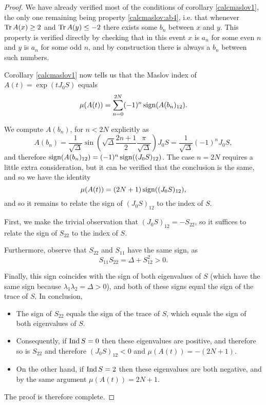 \begin{proof}
We have already verified most of the conditions of corollary \ref{calcmaslov1}, the only one remaining being property \ref{calcmaslov:ab4}, i.e. that whenever $\operatorname{Tr} A(x) \geq 2$ and $\operatorname{Tr} A(y) \leq -2$ there exists some $b_n$ between $x$ and $y$. This property is verified directly by checking that in this event $x$ is $a_n$ for some even $n$ and $y$ is $a_n$ for some odd $n$, and by construction there is always a $b_n$ between such numbers.

Corollary \ref{calcmaslov1} now tells us that the Maslov index of $A(t) = \exp(t J_0 S)$ equals
\begin{equation}
\mu(A(t)) = \sum_{n = 0}^{2N} (-1)^n \operatorname{sign}(A(b_n)_{12}).
\end{equation}

We compute $A(b_n)$, for $n < 2N$ explicitly as
\begin{equation}
A(b_n) = \frac1{\sqrt\Delta} \sin\left( \sqrt\Delta \frac{2n + 1}2 \frac\pi{\sqrt\Delta} \right) J_0 S = \frac1{\sqrt\Delta} (-1)^n J_0 S,
\end{equation}
and therefore $\operatorname{sign}(A(b_n)_{12}) = (-1)^n \operatorname{sign}((J_0 S)_{12})$. The case $n = 2N$ requires a little extra consideration, but it can be verified that the conclusion is the same, and so we have the identity
\begin{equation}
\mu(A(t)) = (2N+1) \operatorname{sign}((J_0 S)_{12}),
\end{equation}
and so it remains to relate the sign of $(J_0 S)_{12}$ to the index of $S$.

First, we make the trivial observation that $(J_0 S)_{12} = - S_{22}$, so it suffices to relate the sign of $S_{22}$ to the index of $S$.

Furthermore, observe that $S_{22}$ and $S_{11}$ have the same sign, as
\begin{equation}
S_{11} S_{22} = \Delta + S_{12}^2 > 0.
\end{equation}

Finally, this sign coincides with the sign of both eigenvalues of $S$ (which have the same sign because $\lambda_1 \lambda_2 = \Delta > 0$), and both of these signs equal the sign of the trace of $S$. In conclusion,
\begin{itemize}
\item The sign of $S_{22}$ equals the sign of the trace of $S$, which equals the sign of both eigenvalues of $S$.
\item Consequently, if $\operatorname{Ind} S = 0$ then these eigenvalues are positive, and therefore so is $S_{22}$ and therefore $(J_0 S)_{12} < 0$ and $\mu(A(t)) = -(2N+1)$.
\item On the other hand, if $\operatorname{Ind} S = 2$ then these eigenvalues are both negative, and by the same argument $\mu(A(t)) = 2N+1$.
\end{itemize}

The proof is therefore complete.
\end{proof}

